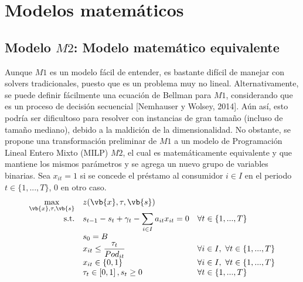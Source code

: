 
\chapter{Modelos matemáticos}
\label{c3} %
\section{Modelo $M2$: Modelo matemático equivalente}

Aunque $M1$ es un modelo fácil de entender, es bastante difícil de manejar con solvers tradicionales, puesto que es un problema muy no lineal. Alternativamente, se puede definir fácilmente una ecuación de Bellman para $M1$, considerando que es un proceso de decisión secuencial [Nemhauser y Wolsey, 2014]. Aún así, esto podría ser dificultoso para resolver con instancias de gran tamaño (incluso de tamaño mediano), debido a la maldición de la dimensionalidad. No obstante, se propone una transformación preliminar de $M1$ a un modelo de Programación Lineal Entero Mixto (MILP) $M2$, el cual es matemáticamente equivalente y que mantiene los mismos parámetros y se agrega un nuevo grupo de variables binarias. Sea $x_{it} = 1$ si se concede el préstamo al consumidor $i \in I$ en el periodo $t \in \{1,...,T\}$, 0 en otro caso.  \\


$$ \begin{array}{r l l}
	\displaystyle\max_{\vb{x}, \tau, \vb{s}} & z(\vb{x}, \tau, \vb{s}) &   									\\
	\text{s.t.}&  s_{t-1} - s_{t} + \gamma_{t} - \displaystyle\sum_{i \in I} a_{it} x_{it} = 0	& \forall t \in \{1,...,T\}		\\
					&  s_{0} = B & 	                                                                                         	\\
					& x_{it} \leq \dfrac{\tau_{t}}{Pod_{it}} & \forall i \in I , \text{  } \forall t \in \{1,...,T\}                 \\
					& x_{it} \in \{0, 1\} & \forall i \in I , \text{  }  \forall t \in \{1,...,T\}                                    \\
					& \tau_{t} \in \left[0,1 \right] , s_{t} \geq 0 & \forall t \in \{1,...,T\}                                            \\
					
\end{array} $$

\newpage

